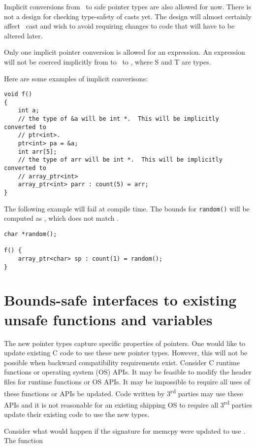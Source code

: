 Implicit conversions  from \unsafeptrvoid\ to safe pointer types are also 
allowed for now.  There is not a  design for checking type-safety of casts yet.  
The design will almost certainly affect \unsafeptrvoid\ cast and wish to avoid
requiring changes to code that will have to be altered later.  

Only one implicit pointer conversion is allowed for an expression.  An expression will not be
coerced implicitly from  to \unsafeptrvoid\ to
, where S and T are types.

Here are some examples of implicit converisons:
\begin{verbatim}
void f() 
{
    int a;
    // the type of &a will be int *.  This will be implicitly converted to
    // ptr<int>.
    ptr<int> pa = &a;
    int arr[5];
    // the type of arr will be int *.  This will be implicitly converted to
    // array_ptr<int> 
    array_ptr<int> parr : count(5) = arr;
}
\end{verbatim}

The following example will fail at compile time. The bounds for \texttt{random()} will
be computed as \boundsnone, which does not match .
\begin{verbatim}
char *random();

f() {
    array_ptr<char> sp : count(1) = random(); 
}
\end{verbatim}

\section{Bounds-safe interfaces to existing unsafe functions and variables}
\label{section:function-bounds-safe-interfaces}

The new pointer types capture specific properties of pointers. One would
like to update existing C code to use these new pointer types. However,
this will not be possible when backward compatibility requirements
exist. Consider C runtime functions or operating system (OS) APIs. 
It may be feasible to modify the header files for runtime functions or OS APIs. 
It may be
impossible to require all uses of these functions or APIs be updated.
Code written by 3\textsuperscript{rd} parties may use these APIs and it
is not reasonable for an existing shipping OS to require all
3\textsuperscript{rd} parties update their existing code to use the new
types.

Consider what would happen if the signature for memcpy were updated to
use \arrayptr. The function

